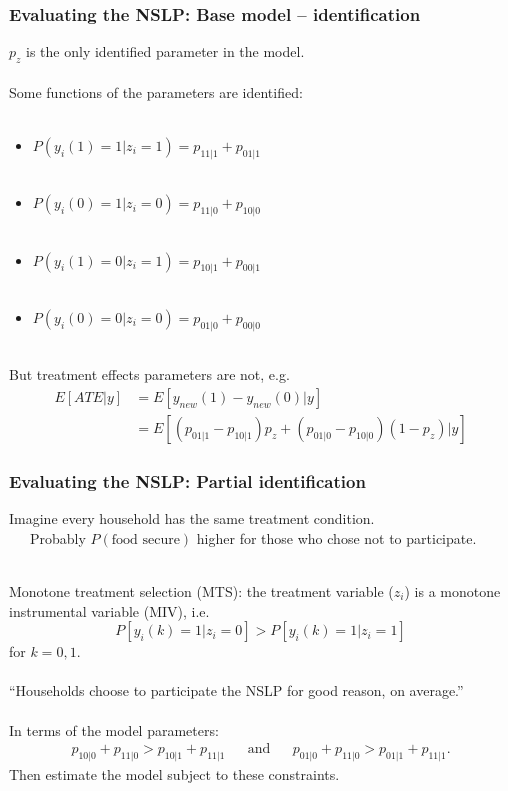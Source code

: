 \documentclass[xcolor=dvipsnames]{beamer}
\begin{document}
\begin{frame}
  \frametitle{Evaluating the NSLP: Base model -- identification}
$p_z$ is the only identified parameter in the model.\\~\\
 Some functions of the parameters are identified: \\~\\
    \begin{itemize}
      \item $P(y_i(1)=1|z_i=1) = p_{11|1} + p_{01|1}$\\~\\  
      \item $P(y_i(0)=1|z_i=0) =p_{11|0} + p_{10|0}$\\~\\
      \item $P(y_i(1)=0|z_i=1) =p_{10|1} + p_{00|1}$\\~\\ 
      \item $P(y_i(0)=0|z_i=0) =p_{01|0} + p_{00|0}$\\~\\
      \end{itemize}
But treatment effects parameters are not, e.g.
\begin{align*}
E[ATE|y] &= E[y_{new}(1) - y_{new}(0)|y] \\
&=E[(p_{01|1} - p_{10|1})p_z + (p_{01|0} - p_{10|0})(1-p_z)|y] 
\end{align*}
\end{frame}

\begin{frame}
\frametitle{Evaluating the NSLP: Partial identification}
Imagine every household has the same treatment condition.\\
\ \ \ Probably $P(\mbox{food secure})$ higher for those who chose not to participate.\\~

\pause Monotone treatment selection (MTS): the treatment variable ($z_i$) is a monotone instrumental variable (MIV), i.e.
\[
P[y_i(k)=1|z_i=0] > P[y_i(k)=1|z_i=1]
\]
for $k=0,1$.\\~\\

``Households choose to participate the NSLP for good reason, on average.''\\~\\

\pause In terms of the model parameters:
\begin{align*}
  p_{10|0} + p_{11|0} > p_{10|1} + p_{11|1} &&\mbox{and}&&  p_{01|0} + p_{11|0} > p_{01|1} + p_{11|1}.
\end{align*}
\pause Then estimate the model subject to these constraints.
\end{frame}
\end{document}
